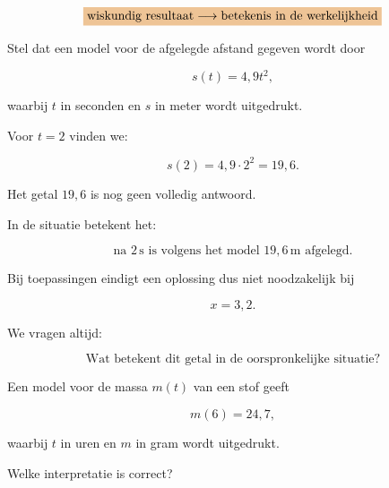 \documentclass{ximera}
\begin{document}
\[
\important{
\text{wiskundig resultaat}
\longrightarrow
\text{betekenis in de werkelijkheid}
}
\]

\begin{voorbeeld}

Stel dat een model voor de afgelegde afstand gegeven wordt door

\[
s(t)=4{,}9t^2,
\]

waarbij $t$ in seconden en $s$ in meter wordt uitgedrukt.

Voor $t=2$ vinden we:

\[
s(2)=4{,}9\cdot2^2=19{,}6.
\]

Het getal
\(
19{,}6
\)
is nog geen volledig antwoord.

In de situatie betekent het:

\[
\boxed{
\text{na }2\,\mathrm s\text{ is volgens het model }19{,}6\,\mathrm m
\text{ afgelegd.}
}
\]

\end{voorbeeld}


\begin{opmerking}
Bij toepassingen eindigt een oplossing dus niet noodzakelijk bij

\[
x=3{,}2.
\]

We vragen altijd:

\[
\boxed{\text{Wat betekent dit getal in de oorspronkelijke situatie?}}
\]
\end{opmerking}


\begin{oefening}{\oefB \ESS}

Een model voor de massa $m(t)$ van een stof geeft

\[
m(6)=24{,}7,
\]

waarbij $t$ in uren en $m$ in gram wordt uitgedrukt.

Welke interpretatie is correct?

\begin{multipleChoice}
\end{multipleChoice}

\end{oefening}


\end{document}
